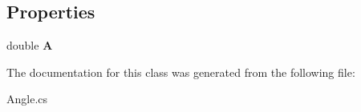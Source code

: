 \subsection*{Properties}
\begin{DoxyCompactItemize}
\item 
\hypertarget{class_console_application2_1_1_angle_acf56ecd8638d8e0895ca4b7efe83bfc9}{}double {\bfseries A}\label{class_console_application2_1_1_angle_acf56ecd8638d8e0895ca4b7efe83bfc9}

\end{DoxyCompactItemize}


The documentation for this class was generated from the following file\+:\begin{DoxyCompactItemize}
\item 
Angle.\+cs\end{DoxyCompactItemize}
